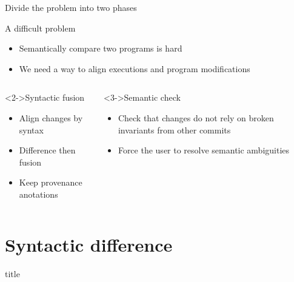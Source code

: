 \documentclass{beamer}
\newcommand{\sectiontitleframe}{
    \begin{frame}
        \vfill
        \centering
        \begin{beamercolorbox}[sep=8pt,center,shadow=true,rounded=true]{title}
            \usebeamerfont{title}\insertsectionhead\par%
        \end{beamercolorbox}
        \vfill
\end{frame}}
\begin{document}
\begin{frame}{Divide the problem into two phases}
\begin{alertblock}{A difficult problem}
\begin{itemize}
 \item Semantically compare two programs is hard
 \item We need a way to align executions and program modifications
\end{itemize}
\end{alertblock}
\begin{columns}
\begin{column}{0.45\textwidth}
\begin{block}<2->{Syntactic fusion}
\begin{itemize}
 \item Align changes by syntax
 \item Difference then fusion
 \item Keep provenance anotations
\end{itemize}
\end{block}
\end{column}
\begin{column}{0.45\textwidth}
\begin{block}<3->{Semantic check}
\begin{itemize}
 \item Check that changes do not rely on broken invariants from other commits
 \item Force the user to resolve semantic ambiguities
\end{itemize}
\end{block}
\end{column}
\end{columns}
\end{frame}

\section{Syntactic difference}
\sectiontitleframe
\end{document}
